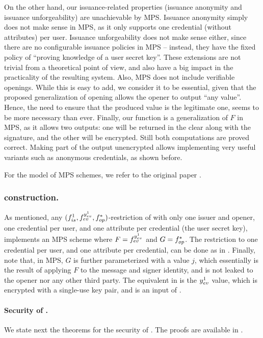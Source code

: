 On the other hand, our issuance-related properties (issuance anonymity and
issuance unforgeability) are unachievable by MPS. Issuance anonymity simply does
not make sense in MPS, as it only supports one credential (without attributes)
per user. Issuance unforgeability does not make sense either, since there are no
configurable issuance policies in MPS -- instead, they have the fixed policy of
``proving knowledge of a user secret key''. These extensions are not trivial
from a theoretical point of view, and also have a big impact in the practicality
of the resulting system. Also, MPS does not include verifiable openings. While
this is easy to add, we consider it to be essential, given that the proposed
generalization of opening allows the opener to output ``any value''. Hence, the
need to ensure that the produced value is the legitimate one, seems to be more
necessary than ever. Finally, our \feval function is a generalization of $F$ in
MPS, as it allows two outputs: one will be returned in the clear along with the
signature, and the other will be encrypted. Still both computations are proved
correct. Making part of the output unencrypted allows implementing very useful
variants such as anonymous credentials, as shown before.

For the model of MPS schemes, we refer to the original paper \needcite.

\subsubsection{\CUASMPS construction.} %
As mentioned, any $(f_{is}^1,f_{ev}^{y_{ev}^1},f_{op}^\ast)$-restriction of
\CUASGen with only one issuer and opener, one credential per user, and one
attribute per credential (the user secret key), implements an MPS scheme where
$F=f_{ev}^{y_{ev}^1}$ and $G=f_{op}^\ast$. The restriction to one credential per
user, and one attribute per credential, can be done as in
. Finally, note that, in MPS, $G$ is further
parameterized with a value $j$, which essentially is the result of applying $F$
to the message and signer identity, and is not leaked to the opener nor any
other third party. The equivalent in \UAS is the $y_{ev}^1$ value, which is
encrypted with a single-use key pair, and is an input of \yinsp.

\paragraph{Security of \CUASMPS.} %
We state next the theorems for the security of \CUASMPS. The proofs are
available in .

